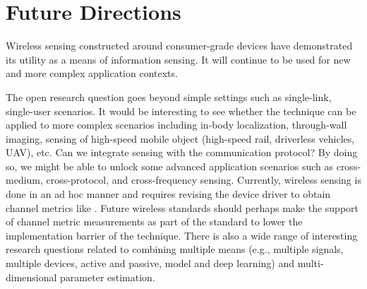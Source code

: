 \section{Future Directions}

Wireless sensing constructed around consumer-grade devices have demonstrated its utility as a means of information sensing. It will
continue to be used for new and more complex application contexts.

The open research question goes beyond simple settings such as single-link, single-user scenarios. It would be interesting to see whether
the technique can be applied to more complex scenarios including in-body localization, through-wall imaging, sensing of high-speed mobile
object (high-speed rail, driverless vehicles, UAV), etc. Can we integrate sensing with the communication protocol? By doing so, we might be
able to unlock some advanced application scenarios such as cross-medium, cross-protocol, and cross-frequency sensing. Currently, wireless
sensing is done in an ad hoc manner and requires revising the device driver to obtain channel metrics like \CSI. Future wireless standards
should perhaps make the support of channel metric measurements as part of the standard to lower the implementation barrier of the technique.
There is also a wide range of interesting research questions related to combining multiple means (e.g., multiple signals, multiple devices,
active and passive, model and deep learning) and multi-dimensional parameter estimation.
